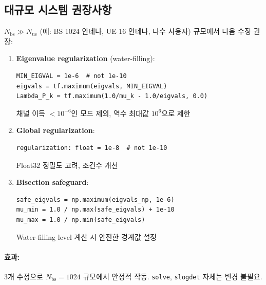 \documentclass[10pt]{article}
\begin{document}
\subsection{대규모 시스템 권장사항}

$N_{\text{bs}} \gg N_{\text{ue}}$ (예: BS 1024 안테나, UE 16 안테나, 다수 사용자) 규모에서 다음 수정 권장:

\begin{enumerate}
\item \textbf{Eigenvalue regularization} (water-filling):
\begin{lstlisting}
MIN_EIGVAL = 1e-6  # not 1e-10
eigvals = tf.maximum(eigvals, MIN_EIGVAL)
Lambda_P_k = tf.maximum(1.0/mu_k - 1.0/eigvals, 0.0)
\end{lstlisting}
채널 이득 $< 10^{-6}$인 모드 제외, 역수 최대값 $10^6$으로 제한

\item \textbf{Global regularization}:
\begin{lstlisting}
regularization: float = 1e-8  # not 1e-10
\end{lstlisting}
Float32 정밀도 고려, 조건수 개선

\item \textbf{Bisection safeguard}:
\begin{lstlisting}
safe_eigvals = np.maximum(eigvals_np, 1e-6)
mu_min = 1.0 / np.max(safe_eigvals) + 1e-10
mu_max = 1.0 / np.min(safe_eigvals)
\end{lstlisting}
Water-filling level 계산 시 안전한 경계값 설정
\end{enumerate}

\paragraph{효과:} 3개 수정으로 $N_{\text{bs}}=1024$ 규모에서 안정적 작동. \texttt{solve}, \texttt{slogdet} 자체는 변경 불필요.
\end{document}
